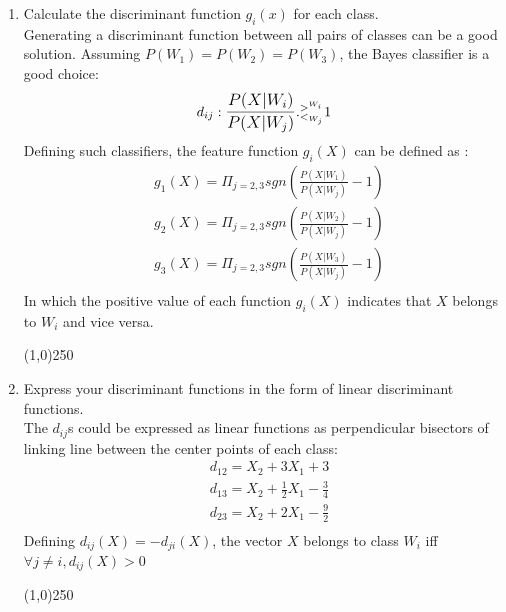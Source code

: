 \documentclass[12pt]{article}
\begin{document}
\begin{enumerate}
\item Calculate the discriminant function $g_i(x)$ for each class. \\
Generating a discriminant function between all pairs of classes can be a good solution. Assuming $P(W_1)=P(W_2)=P(W_3)$, the Bayes classifier is a good choice:
\begin{align*}
d_{ij}: \mathlarger{\frac{P(X|W_i)}{P(X|W_j)}}.^{>^{W_i}}_{<_{W_j}} 1
\end{align*}
Defining such classifiers, the feature function $g_i(X)$ can be defined as :
\begin{align*}
&g_1(X) = \Pi_{j=2,3}sgn(\frac{P(X|W_1)}{P(X|W_j)} - 1) \\
&g_2(X) = \Pi_{j=2,3}sgn(\frac{P(X|W_2)}{P(X|W_j)} - 1) \\
&g_3(X) = \Pi_{j=2,3}sgn(\frac{P(X|W_3)}{P(X|W_j)} - 1) \\
\end{align*}
In which the positive value of each function $g_i(X)$ indicates that $X$ belongs to $W_i$ and vice versa. 

\begin{center}
\line(1,0){250}
\end{center}

\item Express your discriminant functions in the form of linear discriminant functions. \\
The $d_{ij}$s could be expressed as linear functions as perpendicular bisectors of linking line between the center points of each class:
\begin{align*}
&d_{12} = X_2 + 3X_1 + 3 \\
&d_{13} = X_2 + \frac{1}{2}X_1 - \frac{3}{4} \\
&d_{23} = X_2 + 2X_1 - \frac{9}{2} \\
\end{align*}
Defining $d_{ij}(X) = -d_{ji}(X)$, the vector $X$ belongs to class $W_i$ iff $ \forall j \neq i , d_{ij}(X) > 0 $

\begin{center}
\line(1,0){250}
\end{center}


\end{enumerate}
\end{document}
